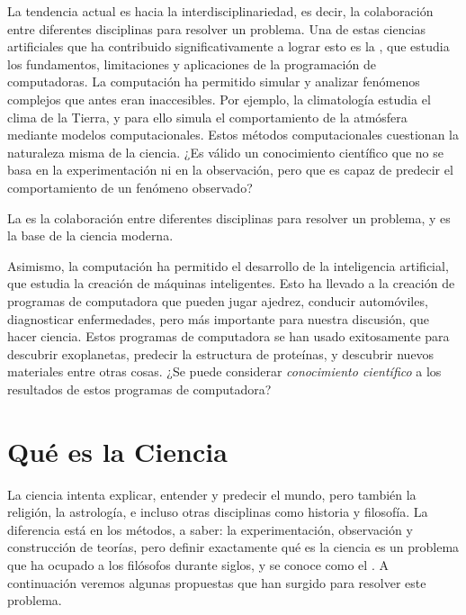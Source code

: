 La tendencia actual es hacia la interdisciplinariedad, es decir, la
colaboración entre diferentes disciplinas para resolver un problema.
Una de estas ciencias artificiales que ha contribuido significativamente a
lograr esto es la , que estudia los fundamentos,
limitaciones y aplicaciones de la programación de computadoras.
La computación ha permitido simular y analizar fenómenos complejos que antes
eran inaccesibles.
Por ejemplo, la climatología estudia el clima de la Tierra, y para ello
simula el comportamiento de la atmósfera mediante modelos computacionales.
Estos métodos computacionales cuestionan la naturaleza misma de la ciencia.
¿Es válido un conocimiento científico que no se basa en la experimentación ni
en la observación, pero que es capaz de predecir el comportamiento de un
fenómeno observado?

\begin{remember}
    \label{rem:interdisciplinariedad}
    La  es la colaboración entre diferentes
    disciplinas para resolver un problema, y es la base de la ciencia moderna.
\end{remember}

Asimismo, la computación ha permitido el desarrollo de la inteligencia
artificial, que estudia la creación de máquinas inteligentes.
Esto ha llevado a la creación de programas de computadora que pueden jugar
ajedrez, conducir automóviles, diagnosticar enfermedades, pero más importante
para nuestra discusión, que hacer ciencia.
Estos programas de computadora se han usado exitosamente para descubrir
exoplanetas, predecir la estructura de proteínas, y descubrir nuevos materiales
entre otras cosas.
¿Se puede considerar \emph{conocimiento científico} a los resultados de estos
programas de computadora?

\section{Qué es la Ciencia}
\label{sec:queeslaciencia}

La ciencia intenta explicar, entender y predecir el mundo, pero también la
religión, la astrología, e incluso otras disciplinas como historia y filosofía.
La diferencia está en los métodos, a saber: la experimentación, observación y
construcción de teorías, pero definir exactamente qué es la ciencia es un
problema que ha ocupado a los filósofos durante siglos, y se conoce como el
.
A continuación veremos algunas propuestas que han surgido para resolver este
problema.

